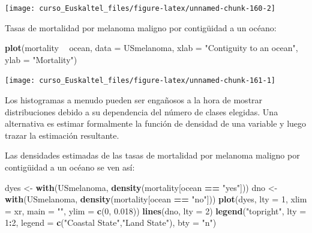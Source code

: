\documentclass[]{book}
\newenvironment{Shaded}{\begin{snugshade}}{\end{snugshade}}
\newcommand{\KeywordTok}[1]{\textcolor[rgb]{0.13,0.29,0.53}{\textbf{#1}}}
\newcommand{\DataTypeTok}[1]{\textcolor[rgb]{0.13,0.29,0.53}{#1}}
\newcommand{\DecValTok}[1]{\textcolor[rgb]{0.00,0.00,0.81}{#1}}
\newcommand{\FloatTok}[1]{\textcolor[rgb]{0.00,0.00,0.81}{#1}}
\newcommand{\StringTok}[1]{\textcolor[rgb]{0.31,0.60,0.02}{#1}}
\newcommand{\OperatorTok}[1]{\textcolor[rgb]{0.81,0.36,0.00}{\textbf{#1}}}
\newcommand{\NormalTok}[1]{#1}
\begin{document}
\begin{center}\texttt{[image: curso\_Euskaltel\_files/figure-latex/unnamed-chunk-160-2]} \end{center}

Tasas de mortalidad por melanoma maligno por contigüidad a un océano:

\begin{Shaded}
\begin{Highlighting}[]
\KeywordTok{plot}\NormalTok{(mortality }\OperatorTok{~}\StringTok{ }\NormalTok{ocean, }\DataTypeTok{data =}\NormalTok{ USmelanoma, }\DataTypeTok{xlab =} \StringTok{"Contiguity to an ocean"}\NormalTok{, }\DataTypeTok{ylab =} \StringTok{"Mortality"}\NormalTok{)}
\end{Highlighting}
\end{Shaded}

\begin{center}\texttt{[image: curso\_Euskaltel\_files/figure-latex/unnamed-chunk-161-1]} \end{center}

Los histogramas a menudo pueden ser engañosos a la hora de mostrar
distribuciones debido a su dependencia del número de clases elegidas.
Una alternativa es estimar formalmente la función de densidad de una
variable y luego trazar la estimación resultante.

Las densidades estimadas de las tasas de mortalidad por melanoma maligno
por contigüidad a un océano se ven así:

\begin{Shaded}
\begin{Highlighting}[]
\NormalTok{dyes <-}\StringTok{ }\KeywordTok{with}\NormalTok{(USmelanoma, }\KeywordTok{density}\NormalTok{(mortality[ocean }\OperatorTok{==}\StringTok{ "yes"}\NormalTok{]))}
\NormalTok{dno <-}\StringTok{ }\KeywordTok{with}\NormalTok{(USmelanoma, }\KeywordTok{density}\NormalTok{(mortality[ocean }\OperatorTok{==}\StringTok{ "no"}\NormalTok{]))}
\KeywordTok{plot}\NormalTok{(dyes, }\DataTypeTok{lty =} \DecValTok{1}\NormalTok{, }\DataTypeTok{xlim =}\NormalTok{ xr, }\DataTypeTok{main =} \StringTok{""}\NormalTok{, }\DataTypeTok{ylim =} \KeywordTok{c}\NormalTok{(}\DecValTok{0}\NormalTok{, }\FloatTok{0.018}\NormalTok{))}
\KeywordTok{lines}\NormalTok{(dno, }\DataTypeTok{lty =} \DecValTok{2}\NormalTok{)}
\KeywordTok{legend}\NormalTok{(}\StringTok{"topright"}\NormalTok{, }\DataTypeTok{lty =} \DecValTok{1}\OperatorTok{:}\DecValTok{2}\NormalTok{, }\DataTypeTok{legend =} \KeywordTok{c}\NormalTok{(}\StringTok{"Coastal State"}\NormalTok{,}\StringTok{"Land State"}\NormalTok{), }\DataTypeTok{bty =} \StringTok{"n"}\NormalTok{)}
\end{Highlighting}
\end{Shaded}
\end{document}
